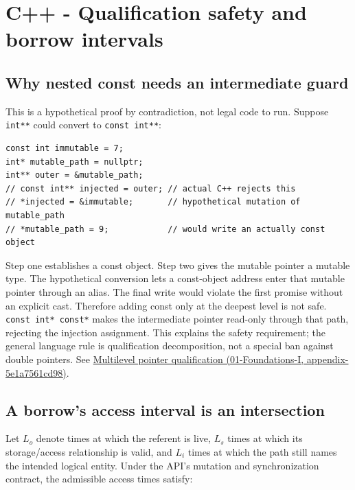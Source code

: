 \section{C++ - Qualification safety and borrow intervals}\label{03-visual-computing-i-ch018-c---qualification-safety-and-borrow-intervals}

\subsection{Why nested const needs an intermediate guard}\label{03-visual-computing-i-ch018-why-nested-const-needs-an-intermediate-guard}

This is a hypothetical proof by contradiction, not legal code to run. Suppose \texttt{int**} could convert to \texttt{const\ int**}:

\begin{verbatim}
const int immutable = 7;
int* mutable_path = nullptr;
int** outer = &mutable_path;
// const int** injected = outer; // actual C++ rejects this
// *injected = &immutable;       // hypothetical mutation of mutable_path
// *mutable_path = 9;            // would write an actually const object
\end{verbatim}

Step one establishes a const object. Step two gives the mutable pointer a mutable type. The hypothetical conversion lets a const-object address enter that mutable pointer through an alias. The final write would violate the first promise without an explicit cast. Therefore adding const only at the deepest level is not safe. \texttt{const\ int*\ const*} makes the intermediate pointer read-only through that path, rejecting the injection assignment. This explains the safety requirement; the general language rule is qualification decomposition, not a special ban against double pointers. See \href{../01-Foundations-I/main.pdf\#nameddest=appendix-5e1a7561cd98}{Multilevel pointer qualification (01-Foundations-I, appendix-5e1a7561cd98)}.

\subsection{A borrow's access interval is an intersection}\label{03-visual-computing-i-ch018-a-borrows-access-interval-is-an-intersection}

Let \(L_o\) denote times at which the referent is live, \(L_s\) times at which its storage/access relationship is valid, and \(L_i\) times at which the path still names the intended logical entity. Under the API's mutation and synchronization contract, the admissible access times satisfy:

